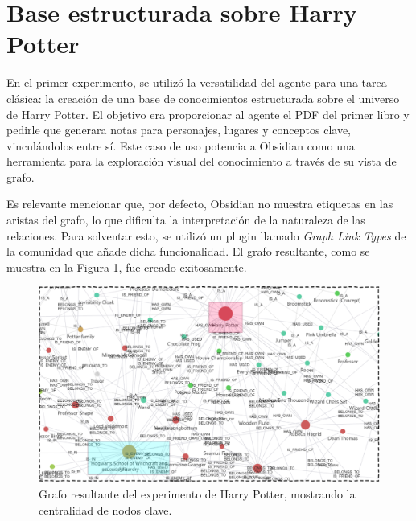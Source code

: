 \section{Base estructurada sobre Harry Potter}
En el primer experimento, se utilizó la versatilidad del agente para una tarea clásica: la creación de una base de conocimientos estructurada sobre el universo de Harry Potter. El objetivo era proporcionar al agente el PDF del primer libro y pedirle que generara notas para personajes, lugares y conceptos clave, vinculándolos entre sí. Este caso de uso potencia a Obsidian como una herramienta para la exploración visual del conocimiento a través de su vista de grafo.

Es relevante mencionar que, por defecto, Obsidian no muestra etiquetas en las aristas del grafo, lo que dificulta la interpretación de la naturaleza de las relaciones. Para solventar esto, se utilizó un plugin llamado \textit{Graph Link Types} de la comunidad que añade dicha funcionalidad. El grafo resultante, como se muestra en la Figura \ref{fig:hp_graph}, fue creado exitosamente. 

\begin{figure}[h]
    \centering
    \includegraphics[width=1.0\textwidth]{figures/HPKG.pdf}
    \caption{Grafo resultante del experimento de Harry Potter, mostrando la centralidad de nodos clave.}
    \label{fig:hp_graph}
\end{figure}


